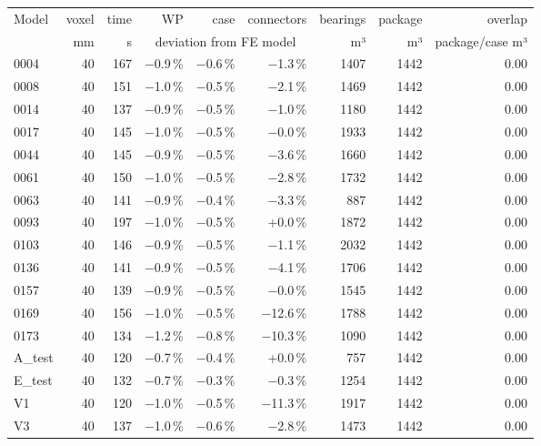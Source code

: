 \begin{tabular}{@{}lrrrrrrrr@{}}\toprule
Model & voxel & time & WP & case & connectors & bearings & package & overlap \\
 & mm & s & \multicolumn{3}{c}{deviation from FE model} & m³ & m³ & package/case m³ \\\midrule
0004 & \num{40} & \num{167} & −\num{0.9}\,\% & −\num{0.6}\,\% & −\num{1.3}\,\% & \num{1407} & \num{1442} & \num{0.00} \\
0008 & \num{40} & \num{151} & −\num{1.0}\,\% & −\num{0.5}\,\% & −\num{2.1}\,\% & \num{1469} & \num{1442} & \num{0.00} \\
0014 & \num{40} & \num{137} & −\num{0.9}\,\% & −\num{0.5}\,\% & −\num{1.0}\,\% & \num{1180} & \num{1442} & \num{0.00} \\
0017 & \num{40} & \num{145} & −\num{1.0}\,\% & −\num{0.5}\,\% & −\num{0.0}\,\% & \num{1933} & \num{1442} & \num{0.00} \\
0044 & \num{40} & \num{145} & −\num{0.9}\,\% & −\num{0.5}\,\% & −\num{3.6}\,\% & \num{1660} & \num{1442} & \num{0.00} \\
0061 & \num{40} & \num{150} & −\num{1.0}\,\% & −\num{0.5}\,\% & −\num{2.8}\,\% & \num{1732} & \num{1442} & \num{0.00} \\
0063 & \num{40} & \num{141} & −\num{0.9}\,\% & −\num{0.4}\,\% & −\num{3.3}\,\% & \num{887} & \num{1442} & \num{0.00} \\
0093 & \num{40} & \num{197} & −\num{1.0}\,\% & −\num{0.5}\,\% & +\num{0.0}\,\% & \num{1872} & \num{1442} & \num{0.00} \\
0103 & \num{40} & \num{146} & −\num{0.9}\,\% & −\num{0.5}\,\% & −\num{1.1}\,\% & \num{2032} & \num{1442} & \num{0.00} \\
0136 & \num{40} & \num{141} & −\num{0.9}\,\% & −\num{0.5}\,\% & −\num{4.1}\,\% & \num{1706} & \num{1442} & \num{0.00} \\
0157 & \num{40} & \num{139} & −\num{0.9}\,\% & −\num{0.5}\,\% & −\num{0.0}\,\% & \num{1545} & \num{1442} & \num{0.00} \\
0169 & \num{40} & \num{156} & −\num{1.0}\,\% & −\num{0.5}\,\% & −\num{12.6}\,\% & \num{1788} & \num{1442} & \num{0.00} \\
0173 & \num{40} & \num{134} & −\num{1.2}\,\% & −\num{0.8}\,\% & −\num{10.3}\,\% & \num{1090} & \num{1442} & \num{0.00} \\
A\_test & \num{40} & \num{120} & −\num{0.7}\,\% & −\num{0.4}\,\% & +\num{0.0}\,\% & \num{757} & \num{1442} & \num{0.00} \\
E\_test & \num{40} & \num{132} & −\num{0.7}\,\% & −\num{0.3}\,\% & −\num{0.3}\,\% & \num{1254} & \num{1442} & \num{0.00} \\
V1 & \num{40} & \num{120} & −\num{1.0}\,\% & −\num{0.5}\,\% & −\num{11.3}\,\% & \num{1917} & \num{1442} & \num{0.00} \\
V3 & \num{40} & \num{137} & −\num{1.0}\,\% & −\num{0.6}\,\% & −\num{2.8}\,\% & \num{1473} & \num{1442} & \num{0.00} \\
\bottomrule\end{tabular}
